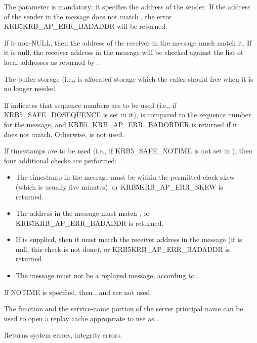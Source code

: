 The  parameter is mandatory; it
specifies the address of the sender.  If the address of the sender in
the message does not match , the error
KRB5KRB_AP_ERR_BADADDR will be returned.

If  is non-NULL, then the address of the receiver
in the message much match it.  If it is null, the receiver address in
the message will be checked against the list of local addresses as
returned by .

The  buffer storage (i.e.,
 is allocated storage which the caller
should free when it is no longer needed.

If  indicates that sequence numbers are to be
used (i.e., if KRB5_SAFE_DOSEQUENCE is set in it),
 is compared to the sequence number for the
message, and KRB5_KRB_AP_ERR_BADORDER is returned if it does not
match.  Otherwise,  is not used.

If timestamps are to be used (i.e., if KRB5_SAFE_NOTIME is not set in
), then four additional checks are performed:
\begin{itemize}
\item The timestamp in the message must be within the permitted clock
	skew (which is usually five minutes), or KRB5KRB_AP_ERR_SKEW
	is returned.
\item The address in the message must match ,
	or KRB5KRB_AP_ERR_BADADDR is returned.
\item If  is supplied, then it must match
	the receiver address in the message (if 
	is null, this check is not done), or KRB5KRB_AP_ERR_BADADDR is
	returned.
\item The message must not be a replayed message, according to
	.
\end{itemize}
If NOTIME is specified, then ,
 and  are not used.


The function  and the service-name
portion of the server principal name can be used to open a
replay cache appropriate to use as .

Returns system errors, integrity errors.

